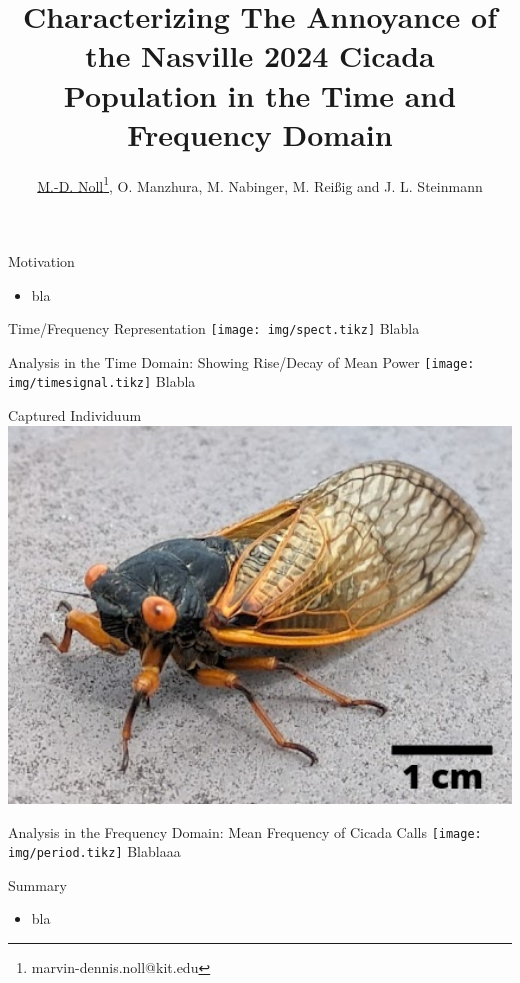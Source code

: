 \documentclass[english]{article}
\title{Characterizing The Annoyance of the Nasville 2024 Cicada Population in the Time and Frequency Domain}
\author{\underline{M.-D. Noll}\thanks{marvin-dennis.noll@kit.edu}, O. Manzhura, M. Nabinger, M. Reißig and J. L. Steinmann
}
\institute{}
\def\boxheight{200mm}
\def\boxsep{6mm}
\begin{document}
	\maketitle
	\vspace{-40mm}
	
	\begin{boxgrayw}[\boxheight]{Motivation}{}
		\begin{itemize}
			\item bla
		\end{itemize}
	\end{boxgrayw}
	\begin{boxgray2w}[\boxheight]{Time/Frequency Representation}{}
		\texttt{[image: img/spect.tikz]}
		Blabla
	\end{boxgray2w}
	\vskip\boxsep
	\begin{boxgray2w}[\boxheight]{Analysis in the Time Domain: Showing Rise/Decay of Mean Power}{}
		\texttt{[image: img/timesignal.tikz]}
		Blabla
	\end{boxgray2w}
	\begin{boxgrayw}[\boxheight]{Captured Individuum}{}
		\includegraphics[width=205mm]{img/vieh2.png}
	\end{boxgrayw}
	\vskip\boxsep
	\begin{boxgray2w}[\boxheight]{Analysis in the Frequency Domain: Mean Frequency of Cicada Calls}{}
		\texttt{[image: img/period.tikz]}
		Blablaaa
	\end{boxgray2w}
	\begin{boxgrayw}[\boxheight]{Summary}{}
		\begin{itemize}
			\item bla
		\end{itemize}
	\end{boxgrayw}
\end{document}

